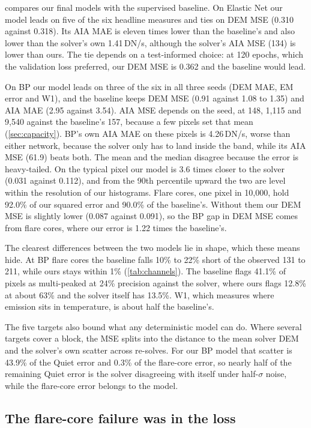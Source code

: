  compares our final models with the supervised baseline. On Elastic Net our model leads on five of the six headline measures and ties on DEM MSE (0.310 against 0.318). Its AIA MAE is eleven times lower than the baseline's and also lower than the solver's own 1.41\,DN/s, although the solver's AIA MSE (134) is lower than ours. The tie depends on a test-informed choice: at 120 epochs, which the validation loss preferred, our DEM MSE is 0.362 and the baseline would lead.

On BP our model leads on three of the six in all three seeds (DEM MAE, EM error and W1), and the baseline keeps DEM MSE (0.91 against 1.08 to 1.35) and AIA MAE (2.95 against 3.54). AIA MSE depends on the seed, at 148, 1,115 and 9,540 against the baseline's 157, because a few pixels set that mean (\cref{sec:capacity}). BP's own AIA MAE on these pixels is 4.26\,DN/s, worse than either network, because the solver only has to land inside the band, while its AIA MSE (61.9) beats both. The mean and the median disagree because the error is heavy-tailed. On the typical pixel our model is 3.6 times closer to the solver (0.031 against 0.112), and from the 90th percentile upward the two are level within the resolution of our histograms. Flare cores, one pixel in 10,000, hold 92.0\% of our squared error and 90.0\% of the baseline's. Without them our DEM MSE is slightly lower (0.087 against 0.091), so the BP gap in DEM MSE comes from flare cores, where our error is 1.22 times the baseline's.

The clearest differences between the two models lie in shape, which these means hide. At BP flare cores the baseline falls 10\% to 22\% short of the observed 131 to 211\Ang, while ours stays within 1\% (\cref{tab:channels}). The baseline flags 41.1\% of pixels as multi-peaked at 24\% precision against the solver, where ours flags 12.8\% at about 63\% and the solver itself has 13.5\%. W1, which measures where emission sits in temperature, is about half the baseline's.

The five targets also bound what any deterministic model can do. Where several targets cover a block, the MSE splits into the distance to the mean solver DEM and the solver's own scatter across re-solves. For our BP model that scatter is 43.9\% of the Quiet error and 0.3\% of the flare-core error, so nearly half of the remaining Quiet error is the solver disagreeing with itself under half-$\sigma$ noise, while the flare-core error belongs to the model.

\subsection{The flare-core failure was in the loss}
\label{sec:flare}

